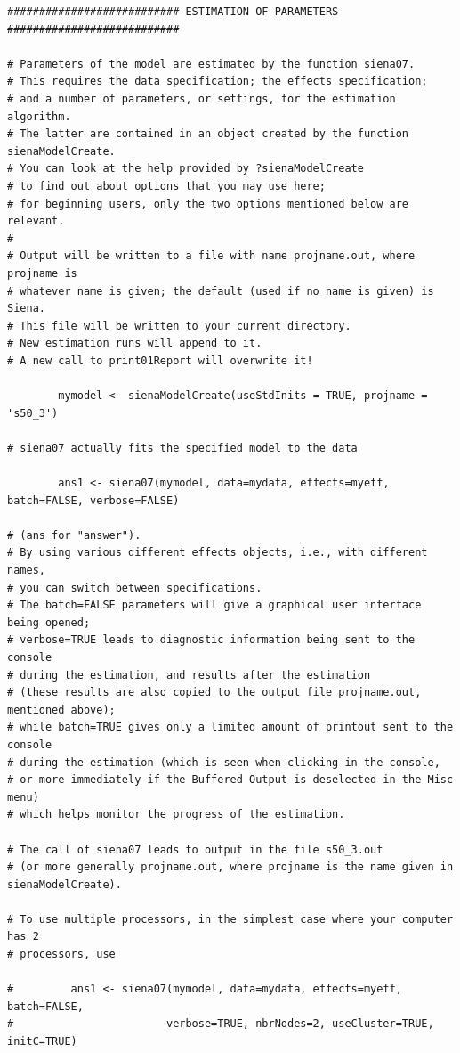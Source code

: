 \documentclass[a4paper,fleqn]{article}
\newcommand{\+}{\, + \,}
\begin{document}
{\begin{verbatim}
########################### ESTIMATION OF PARAMETERS ###########################

# Parameters of the model are estimated by the function siena07.
# This requires the data specification; the effects specification;
# and a number of parameters, or settings, for the estimation algorithm.
# The latter are contained in an object created by the function sienaModelCreate.
# You can look at the help provided by ?sienaModelCreate
# to find out about options that you may use here;
# for beginning users, only the two options mentioned below are relevant.
#
# Output will be written to a file with name projname.out, where projname is
# whatever name is given; the default (used if no name is given) is Siena.
# This file will be written to your current directory.
# New estimation runs will append to it.
# A new call to print01Report will overwrite it!

        mymodel <- sienaModelCreate(useStdInits = TRUE, projname = 's50_3')

# siena07 actually fits the specified model to the data

        ans1 <- siena07(mymodel, data=mydata, effects=myeff, batch=FALSE, verbose=FALSE)

# (ans for "answer").
# By using various different effects objects, i.e., with different names,
# you can switch between specifications.
# The batch=FALSE parameters will give a graphical user interface being opened;
# verbose=TRUE leads to diagnostic information being sent to the console
# during the estimation, and results after the estimation
# (these results are also copied to the output file projname.out, mentioned above);
# while batch=TRUE gives only a limited amount of printout sent to the console
# during the estimation (which is seen when clicking in the console,
# or more immediately if the Buffered Output is deselected in the Misc menu)
# which helps monitor the progress of the estimation.

# The call of siena07 leads to output in the file s50_3.out
# (or more generally projname.out, where projname is the name given in sienaModelCreate).

# To use multiple processors, in the simplest case where your computer has 2
# processors, use

#         ans1 <- siena07(mymodel, data=mydata, effects=myeff, batch=FALSE,
#                        verbose=TRUE, nbrNodes=2, useCluster=TRUE, initC=TRUE)


\end{verbatim}}
\end{document}
